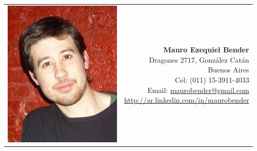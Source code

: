 \documentclass{res}
\begin{document}
\thispagestyle{empty} %

\begin{tabular}{l r}
  \includegraphics[bb=0 0 213 266,scale=0.35,keepaspectratio=true]{./yo.jpg} &
  \raisebox{1,1cm}[1,1cm][0cm]{
  \parbox{360px}{\raggedleft 
		\textbf{\Large Mauro Ezequiel Bender} \\
		Dragones 2717, González Catán \\
		Buenos Aires \\
		Cel: (011) 15-3911-4033  \\
		Email: \href{mailto:maurobender@gmail.com}{maurobender@gmail.com} \\
		\url{http://ar.linkedin.com/in/maurobender} \\
		\vspace{40px}
		}
	}
\end{tabular}
\end{document}
